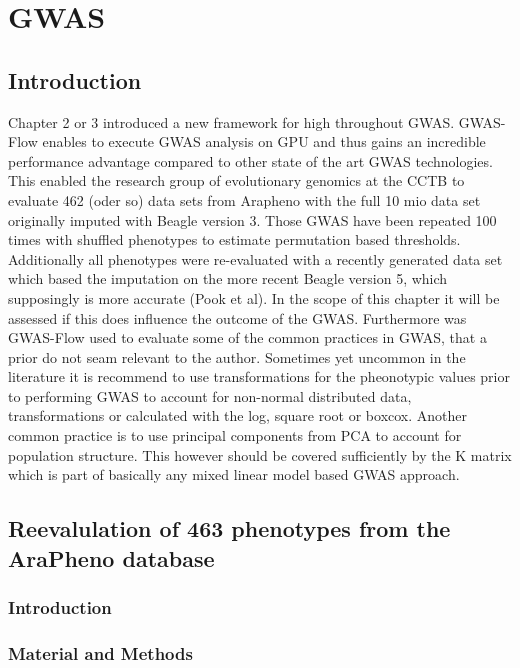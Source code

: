 
\chapter{GWAS}

\label{Chapter5} %

\section{Introduction}
Chapter 2 or 3 introduced a new framework for high throughout GWAS. GWAS-Flow enables to execute GWAS analysis
on GPU and thus gains an incredible performance advantage compared to other state of the art GWAS
technologies. This enabled the research group of evolutionary genomics at the CCTB to evaluate 462 (oder so)
data sets from Arapheno with the full 10 mio data set originally imputed with Beagle version 3.  Those GWAS
have been repeated 100 times with shuffled phenotypes to estimate permutation based thresholds. Additionally
all phenotypes were re-evaluated with a recently generated data set which based the imputation on the more
recent Beagle version 5, which supposingly is more accurate (Pook et al). In the scope of this chapter it will
be assessed if this does influence the outcome of the GWAS. Furthermore was GWAS-Flow used to evaluate some of
the common practices in GWAS, that a prior do not seam relevant to the author. Sometimes yet uncommon in the
literature it is recommend to use transformations for the pheonotypic values prior to performing GWAS to
account for non-normal distributed data, transformations or calculated with the log, square root or
boxcox. Another common practice is to use principal components from PCA to account for population
structure. This however should be covered sufficiently by the K matrix which is part of basically any mixed
linear model based GWAS approach.


\section{Reevalulation of 463 phenotypes from the AraPheno database}

\subsection{Introduction}
\subsection{Material and Methods}
